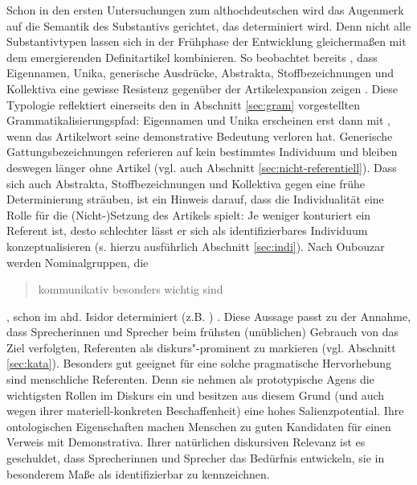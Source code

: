 Schon in den ersten Untersuchungen zum althochdeutschen  wird das Augenmerk auf die Semantik des Substantivs gerichtet, das determiniert wird. Denn nicht alle Substantivtypen lassen sich in der Frühphase der Entwicklung gleichermaßen mit dem emergierenden Definitartikel kombinieren. So beobachtet bereits \textcite{Graf1905}, dass Eigennamen, Unika, generische Ausdrücke, Abstrakta, Stoffbezeichnungen und Kollektiva eine gewisse Resistenz gegenüber der Artikelexpansion zeigen \parencite[ähnlich][]{Bell1907, Hodler1954}. Diese Typologie reflektiert einerseits den in Abschnitt \ref{sec:gram} vorgestellten Grammatikalisierungspfad: Eigennamen und Unika erscheinen erst dann mit , wenn das Artikelwort seine demonstrative Bedeutung verloren hat. Generische Gattungsbezeichnungen referieren auf kein bestimmtes Individuum und bleiben deswegen länger ohne Artikel (vgl. auch Abschnitt \ref{sec:nicht-referentiell}). Dass sich auch Abstrakta, Stoffbezeichnungen und Kollektiva  gegen eine frühe Determinierung sträuben, ist ein Hinweis darauf, dass die Individualität eine Rolle für die (Nicht-)Setzung des Artikels spielt: Je weniger konturiert ein Referent ist, desto schlechter lässt er sich als identifizierbares Individuum konzeptualisieren (s. hierzu ausführlich Abschnitt \ref{sec:indi}). 
Nach Oubouzar werden Nominalgruppen, die \blockcquote[75]{Oubouzar1992}{kommunikativ besonders wichtig sind}, schon im ahd. Isidor determiniert (z.B.  ) \parencite[vgl. auch][117f.]{Oubouzar1989}.  
Diese Aussage passt zu der Annahme, dass Sprecherinnen  und Sprecher beim frühsten (unüblichen) Gebrauch von  das Ziel verfolgten, Referenten als diskurs"-prominent zu markieren (vgl. Abschnitt \ref{sec:kata}). 
Besonders gut geeignet für eine solche pragmatische Hervorhebung sind menschliche Referenten. Denn sie nehmen als prototypische Agens die wichtigsten Rollen im Diskurs ein und besitzen aus diesem Grund (und auch wegen ihrer materiell-konkreten Beschaffenheit) eine hohes Salienzpotential. Ihre ontologischen Eigenschaften machen Menschen zu guten Kandidaten für einen Verweis mit  Demonstrativa. Ihrer natürlichen diskursiven Relevanz ist es geschuldet, dass Sprecherinnen und Sprecher das Bedürfnis entwickeln, sie in besonderem Maße als identifizierbar zu kennzeichnen. 
